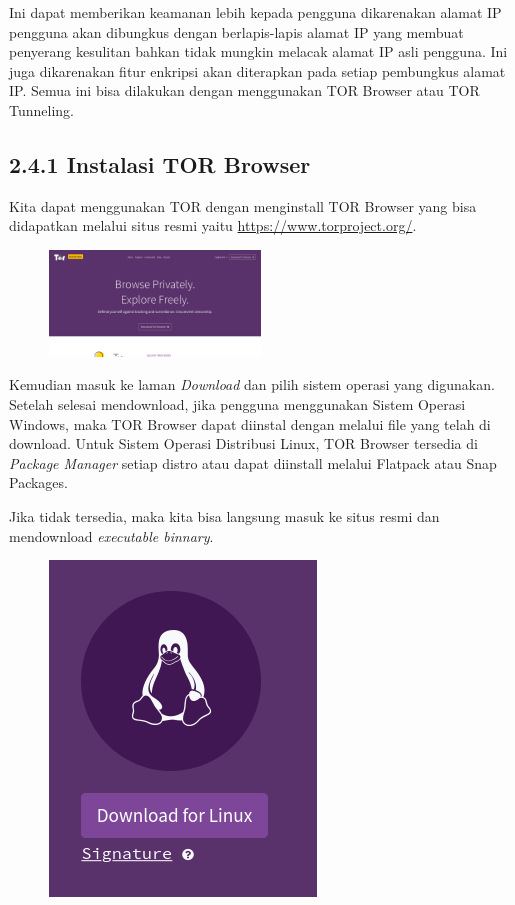 \documentclass{article}
\begin{document}
        Ini dapat memberikan keamanan lebih kepada pengguna dikarenakan alamat IP pengguna
        akan dibungkus dengan berlapis-lapis alamat IP yang membuat penyerang kesulitan bahkan
        tidak mungkin melacak alamat IP asli pengguna. Ini juga dikarenakan fitur enkripsi
        akan diterapkan pada setiap pembungkus alamat IP. Semua ini bisa dilakukan dengan 
        menggunakan TOR Browser atau TOR Tunneling.

       \subsection*{2.4.1 Instalasi TOR Browser } 
       Kita dapat menggunakan TOR dengan menginstall TOR Browser yang bisa didapatkan melalui 
        situs resmi yaitu \url{https://www.torproject.org/}.

        \begin{figure}[h]
        \includegraphics[scale=0.5, width=0.5\textwidth]{tor-web.png}
        \centering 
        \end{figure}

        Kemudian masuk ke laman \textit{Download} dan pilih sistem operasi yang digunakan.
        Setelah selesai mendownload, jika pengguna menggunakan Sistem Operasi Windows, maka
        TOR Browser dapat diinstal dengan melalui file yang telah di download. 
        Untuk Sistem Operasi Distribusi Linux, TOR Browser tersedia di \textit{Package Manager}
        setiap distro atau dapat diinstall melalui Flatpack atau Snap Packages.

        Jika tidak tersedia, maka kita bisa langsung masuk ke situs resmi dan mendownload
        \textit{executable binnary}.

        \begin{figure}[h]
        \includegraphics[scale=0.3]{tor-linux.png}
        \centering
        \end{figure}
\end{document}
